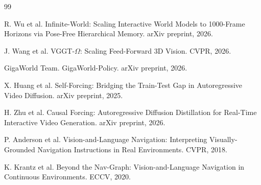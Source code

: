 \documentclass[11pt,a4paper]{ctexart}
\begin{document}
\begin{thebibliography}{99}

R. Wu et al.
\newblock Infinite-World: Scaling Interactive World Models to 1000-Frame Horizons via Pose-Free Hierarchical Memory.
\newblock arXiv preprint, 2026.

J. Wang et al.
\newblock VGGT-\(\Omega\): Scaling Feed-Forward 3D Vision.
\newblock CVPR, 2026.

GigaWorld Team.
\newblock GigaWorld-Policy.
\newblock arXiv preprint, 2026.

X. Huang et al.
\newblock Self-Forcing: Bridging the Train-Test Gap in Autoregressive Video Diffusion.
\newblock arXiv preprint, 2025.

H. Zhu et al.
\newblock Causal Forcing: Autoregressive Diffusion Distillation for Real-Time Interactive Video Generation.
\newblock arXiv preprint, 2026.

P. Anderson et al.
\newblock Vision-and-Language Navigation: Interpreting Visually-Grounded Navigation Instructions in Real Environments.
\newblock CVPR, 2018.

K. Krantz et al.
\newblock Beyond the Nav-Graph: Vision-and-Language Navigation in Continuous Environments.
\newblock ECCV, 2020.

\end{thebibliography}
\end{document}
